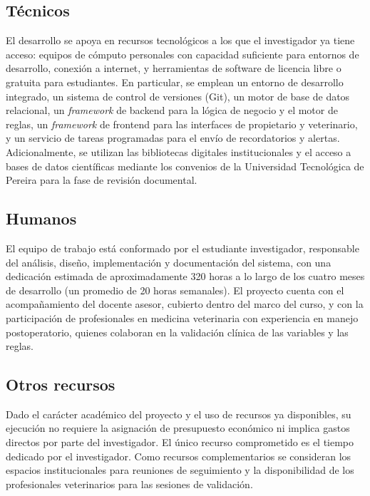 \documentclass[stu, spanish]{apa7}
\begin{document}
\subsection{T\'{e}cnicos}
El desarrollo se apoya en recursos tecnol\'{o}gicos a los que el investigador ya tiene acceso: equipos de c\'{o}mputo personales con capacidad suficiente para entornos de desarrollo, conexi\'{o}n a internet, y herramientas de software de licencia libre o gratuita para estudiantes. En particular, se emplean un entorno de desarrollo integrado, un sistema de control de versiones (Git), un motor de base de datos relacional, un \textit{framework} de backend para la l\'{o}gica de negocio y el motor de reglas, un \textit{framework} de frontend para las interfaces de propietario y veterinario, y un servicio de tareas programadas para el env\'{i}o de recordatorios y alertas. Adicionalmente, se utilizan las bibliotecas digitales institucionales y el acceso a bases de datos cient\'{i}ficas mediante los convenios de la Universidad Tecnol\'{o}gica de Pereira para la fase de revisi\'{o}n documental.

\subsection{Humanos}
El equipo de trabajo est\'{a} conformado por el estudiante investigador, responsable del an\'{a}lisis, dise\~{n}o, implementaci\'{o}n y documentaci\'{o}n del sistema, con una dedicaci\'{o}n estimada de aproximadamente 320 horas a lo largo de los cuatro meses de desarrollo (un promedio de 20 horas semanales). El proyecto cuenta con el acompa\~{n}amiento del docente asesor, cubierto dentro del marco del curso, y con la participaci\'{o}n de profesionales en medicina veterinaria con experiencia en manejo postoperatorio, quienes colaboran en la validaci\'{o}n cl\'{i}nica de las variables y las reglas.

\subsection{Otros recursos}
Dado el car\'{a}cter acad\'{e}mico del proyecto y el uso de recursos ya disponibles, su ejecuci\'{o}n no requiere la asignaci\'{o}n de presupuesto econ\'{o}mico ni implica gastos directos por parte del investigador. El \'{u}nico recurso comprometido es el tiempo dedicado por el investigador. Como recursos complementarios se consideran los espacios institucionales para reuniones de seguimiento y la disponibilidad de los profesionales veterinarios para las sesiones de validaci\'{o}n.
\end{document}
